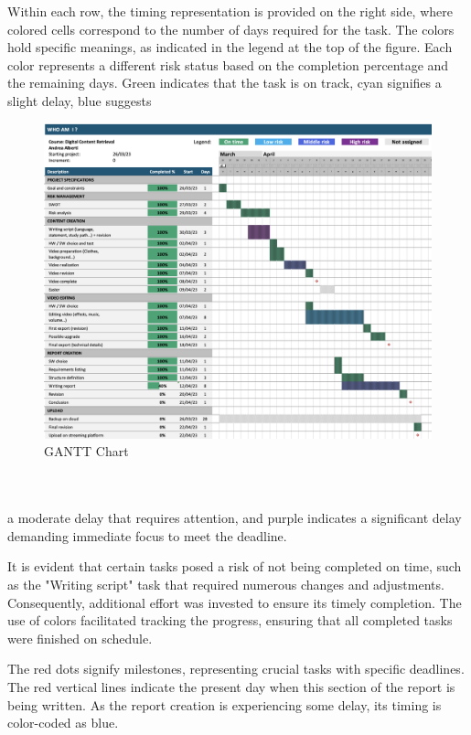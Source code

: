 \documentclass{article}
\begin{document}
\begin{multicols}{2}
    Within each row, the timing representation is provided on the right side, where colored cells correspond to the number of days required for the task. The 
    colors hold specific meanings, as indicated in the legend at the top of the figure. Each color represents a different risk status based on the completion 
    percentage and the remaining days. Green indicates that the task is on track, cyan signifies a slight delay, blue suggests
    \begin{figure}[H]
        \centering
        \includegraphics[width=1\textwidth]{GANTT.png}
        \caption{GANTT Chart}
        \label{fig:gantt}
    \end{figure}
    \noindent
    \\
    \\
    a moderate delay that requires 
    attention, and purple indicates a significant delay demanding immediate focus to meet the deadline.

    It is evident that certain tasks posed a risk of not being completed on time, such as the "Writing script" task that required numerous changes and adjustments. 
    Consequently, additional effort was invested to ensure its timely completion. The use of colors facilitated tracking the progress, ensuring that all completed 
    tasks were finished on schedule.

    The red dots signify milestones, representing crucial tasks with specific deadlines. The red vertical lines indicate the present day when this section of the 
    report is being written. As the report creation is experiencing some delay, its timing is color-coded as blue.
    

\end{multicols}
\end{document}
